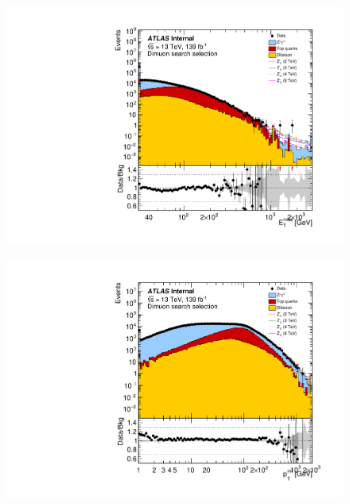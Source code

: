 \begin{figure}[h!]
\captionsetup[subfigure]{position=b}
\centering
 \begin{minipage}[b]{.45\linewidth}
    \includegraphics[width=1\textwidth]{figures/ci/dataMc/stacks_mc16e_2015-2018_uu_met_log100.pdf}
    \subcaption{}\label{fig:1a}
\end{minipage}
\begin{minipage}[b]{.45\linewidth}
    \includegraphics[width=1\textwidth]{figures/ci/dataMc/stacks_mc16e_2015-2018_uu_ptll_log100.pdf}
    \subcaption{}
\end{minipage} \\
\begin{minipage}[b]{.45\linewidth}

\end{minipage}
\end{figure}
